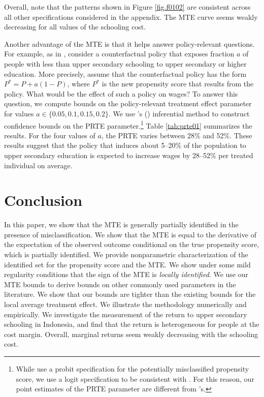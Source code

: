\documentclass[11pt,reqno]{amsart}
\theoremstyle{plain}
\numberwithin{equation}{section}
\begin{document}
Overall, note that the patterns shown in Figure \ref{fig.f0102} are consistent across all other specifications considered in the appendix. The MTE curve seems weakly decreasing for all values of the schooling cost. 

Another advantage of the MTE is that it helps answer policy-relevant questions. For example, as in \cite{SasakiUra2021}, consider a counterfactual policy that exposes fraction $a$ of people with less than upper secondary schooling to upper secondary or higher education. More precisely,  assume that the counterfactual policy has the form $P^* = P+a (1-P)$, where $P^*$ is the new propensity score that results from the policy. What would be the effect of such a policy on wages? To answer this question, we compute bounds on the policy-relevant treatment effect parameter for values $a \in \{0.05,0.1,0.15,0.2\}$. We use \citeauthor{SasakiUra2021}'s (\citeyear{SasakiUra2021}) inferential method to construct confidence bounds on the PRTE parameter.\footnote{While \cite{SasakiUra2021} use a probit specification for the potentially misclassified propensity score, we use a logit specification to be consistent with \cite{Carneiroal2017}. For this reason, our point estimates of the PRTE parameter are different from \citeauthor{SasakiUra2021}'s.} Table \ref{tab:prte01} summarizes the results. For the four values of $a$, the PRTE varies between 28\% and 52\%. These results suggest that the policy that induces about 5--20\% of the population to upper secondary education is expected to increase wages by 28--52\% per treated individual on average.

\section{Conclusion}\label{conclusion}
In this paper, we show that the MTE is generally partially identified in the presence of misclassification. We show that the MTE is equal to the derivative of the expectation of the observed outcome conditional on the true propensity score, which is partially identified. We provide nonparametric characterization of the identified set for the propensity score and the MTE. We show under some mild regularity conditions that the sign of the MTE is \textit{locally identified}. We use our MTE bounds to derive bounds on other commonly used parameters in the literature. We show that  our bounds are tighter than the existing bounds for the local average treatment effect. We illustrate the methodology numerically and empirically. We investigate the measurement of the return to upper secondary schooling in Indonesia, and find that the return is heterogeneous for people at the cost margin. Overall, marginal returns seem weakly decreasing with the schooling cost.   
\end{document}
